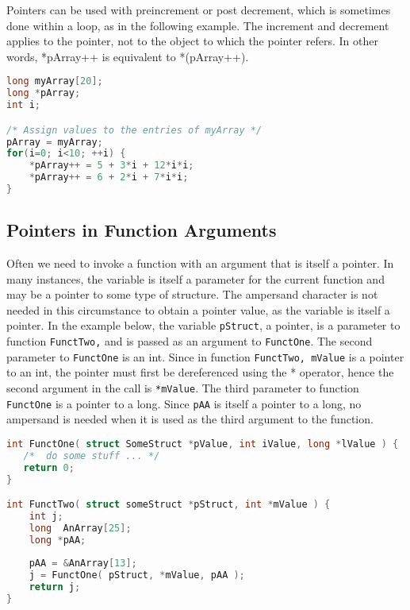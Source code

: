 Pointers can be used with preincrement or post decrement, which is sometimes
done within a loop, as in the following example. The increment and decrement
applies to the pointer, not to the object to which the pointer refers.  In
other words, *pArray++ is equivalent to *(pArray++).
\lstset{basicstyle=\scriptsize, numbers=left, captionpos=b, tabsize=4}
\begin{lstlisting}[caption=Section \thesection listing \arabic{pntcnt},language={C},
breaklines=true,xleftmargin=15pt,label=lst:section\thesection listing\arabic{pntcnt}]
long myArray[20];
long *pArray;
int i;

/* Assign values to the entries of myArray */
pArray = myArray;
for(i=0; i<10; ++i) {
	*pArray++ = 5 + 3*i + 12*i*i;
	*pArray++ = 6 + 2*i + 7*i*i;
}
\end{lstlisting}

\subsection{Pointers in Function Arguments}
Often we need to invoke a function with an argument that is itself a pointer.
In many instances, the variable is itself a parameter for the current function
and may be a pointer to some type of structure. The ampersand character is not
needed in this circumstance to obtain a pointer value, as the variable is
itself a pointer. In the example below, the variable \texttt{pStruct}, a
pointer, is a parameter to function \texttt{FunctTwo,} and is passed as an
argument to \texttt{FunctOne}.  The second parameter to \texttt{FunctOne} is an
int. Since in function \texttt{FunctTwo, mValue} is a pointer to an int, the
pointer must first be dereferenced using the * operator, hence the second
argument in the call is \texttt{*mValue}. The third parameter to function
\texttt{FunctOne} is a pointer to a long. Since \texttt{pAA} is itself a
pointer to a long, no ampersand is needed when it is used as the third argument
to the function.
\lstset{basicstyle=\scriptsize, numbers=left, captionpos=b, tabsize=4}
\begin{lstlisting}[caption=Section \thesection listing \arabic{pntcnt},language={C},
breaklines=true,xleftmargin=15pt,label=lst:section\thesection listing\arabic{pntcnt}]
int FunctOne( struct SomeStruct *pValue, int iValue, long *lValue ) {
   /*  do some stuff ... */
   return 0;
}

int FunctTwo( struct someStruct *pStruct, int *mValue ) {
	int j;
	long  AnArray[25];
	long *pAA;
	 
	pAA = &AnArray[13];
	j = FunctOne( pStruct, *mValue, pAA );
	return j;
}
\end{lstlisting}

